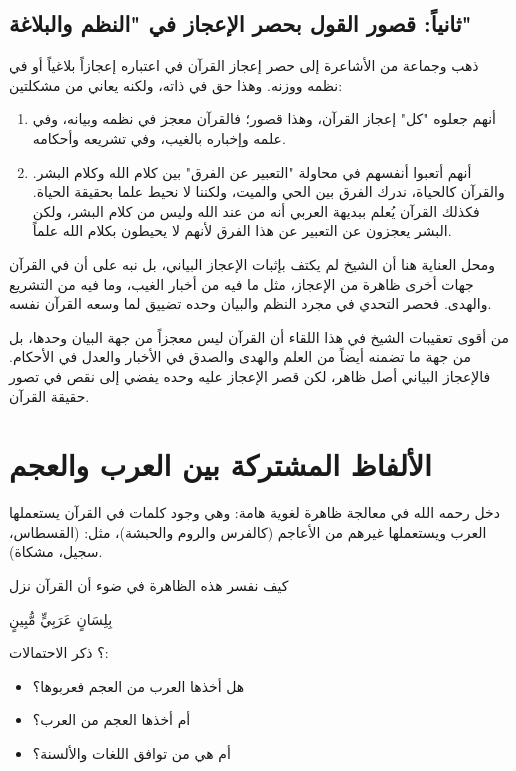 \subsection{ثانياً: قصور القول بحصر الإعجاز في "النظم والبلاغة"}
ذهب  وجماعة من الأشاعرة إلى حصر إعجاز القرآن في اعتباره إعجازاً بلاغياً أو في نظمه ووزنه. وهذا حق في ذاته، ولكنه يعاني من مشكلتين:
 \begin{enumerate}
    \item أنهم جعلوه "كل" إعجاز القرآن، وهذا قصور؛ فالقرآن معجز في نظمه وبيانه، وفي علمه وإخباره بالغيب، وفي تشريعه وأحكامه.
    \item أنهم أتعبوا أنفسهم في محاولة "التعبير عن الفرق" بين كلام الله وكلام البشر. والقرآن كالحياة، ندرك الفرق بين الحي والميت، ولكننا لا نحيط علما بحقيقة الحياة. فكذلك القرآن يُعلم ببديهة العربي أنه من عند الله وليس من كلام البشر، ولكن البشر يعجزون عن التعبير عن هذا الفرق لأنهم لا يحيطون بكلام الله علماً.
\end{enumerate}

ومحل العناية هنا أن الشيخ لم يكتف بإثبات الإعجاز البياني، بل نبه على أن في القرآن جهات أخرى ظاهرة من الإعجاز، مثل ما فيه من أخبار الغيب، وما فيه من التشريع والهدى. فحصر التحدي في مجرد النظم والبيان وحده تضييق لما وسعه القرآن نفسه.

\begin{fawaid}
من أقوى تعقيبات الشيخ في هذا اللقاء أن القرآن ليس معجزاً من جهة البيان وحدها، بل من جهة ما تضمنه أيضاً من العلم والهدى والصدق في الأخبار والعدل في الأحكام. فالإعجاز البياني أصل ظاهر، لكن قصر الإعجاز عليه وحده يفضي إلى نقص في تصور حقيقة القرآن.
\end{fawaid}

\separator

\section{الألفاظ المشتركة بين العرب والعجم}
دخل  رحمه الله في معالجة ظاهرة لغوية هامة: وهي وجود كلمات في القرآن يستعملها العرب ويستعملها غيرهم من الأعاجم (كالفرس والروم والحبشة)، مثل: (القسطاس، سجيل، مشكاة).

كيف نفسر هذه الظاهرة في ضوء أن القرآن نزل \begin{ayah}بِلِسَانٍ عَرَبِيٍّ مُّبِينٍ\end{ayah}؟
ذكر  الاحتمالات:
\begin{itemize}
    \item هل أخذها العرب من العجم فعربوها؟
    \item أم أخذها العجم من العرب؟
    \item أم هي من توافق اللغات والألسنة؟
\end{itemize}

